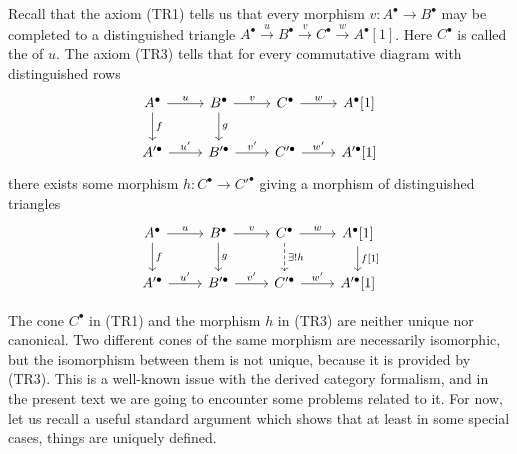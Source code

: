 Recall that the axiom (TR1) tells us that every morphism
$v\colon A^\bullet \to B^\bullet$ may be completed to a distinguished triangle
$A^\bullet \xrightarrow{u} B^\bullet \xrightarrow{v} C^\bullet \xrightarrow{w} A^\bullet [1]$.
Here $C^\bullet$ is called the  of $u$. The axiom (TR3) tells that
for every commutative diagram with distinguished rows
\begin{equation}
  \label{eqn:TR3-input}
  \begin{tikzcd}
    A^\bullet\ar{r}{u}\ar{d}{f} & B^\bullet\ar{r}{v}\ar{d}{g} & C^\bullet\ar{r}{w} & A^\bullet [1] \\
    A'^\bullet\ar{r}{u'} & B'^\bullet\ar{r}{v'} & C'^\bullet\ar{r}{w'} & A'^\bullet [1]
  \end{tikzcd}
\end{equation}
there exists some morphism $h\colon C^\bullet \to C'^\bullet$ giving a morphism
of distinguished triangles
\begin{equation}
  \label{eqn:TR3-output}
  \begin{tikzcd}
    A^\bullet\ar{r}{u}\ar{d}{f} & B^\bullet\ar{r}{v}\ar{d}{g} & C^\bullet\ar{r}{w}\ar[dashed]{d}{\exists ! h} & A^\bullet [1]\ar{d}{f [1]} \\
    A'^\bullet\ar{r}{u'} & B'^\bullet\ar{r}{v'} & C'^\bullet\ar{r}{w'} & A'^\bullet [1]
  \end{tikzcd}
\end{equation}

The cone $C^\bullet$ in (TR1) and the morphism $h$ in (TR3) are neither unique
nor canonical. Two different cones of the same morphism are necessarily
isomorphic, but the isomorphism between them is not unique, because it is
provided by (TR3). This is a well-known issue with the derived category
formalism, and in the present text we are going to encounter some problems
related to it. For now, let us recall a useful standard argument which shows
that at least in some special cases, things are uniquely defined.

